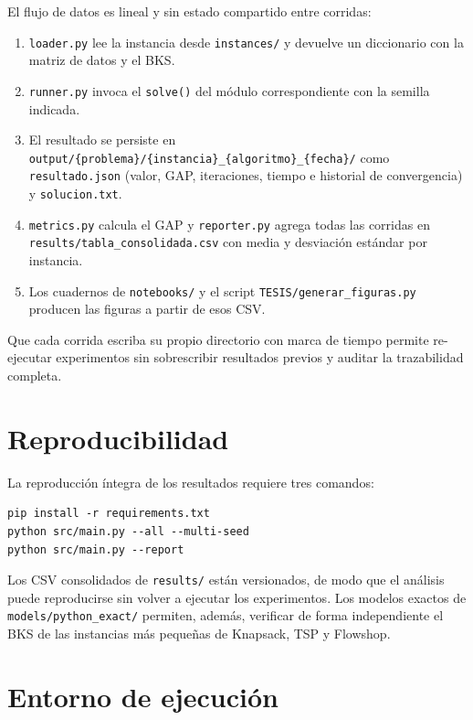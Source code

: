 El flujo de datos es lineal y sin estado compartido entre corridas:

\begin{enumerate}
  \item \texttt{loader.py} lee la instancia desde \texttt{instances/} y
    devuelve un diccionario con la matriz de datos y el BKS.
  \item \texttt{runner.py} invoca el \texttt{solve()} del módulo
    correspondiente con la semilla indicada.
  \item El resultado se persiste en
    \texttt{output/\{problema\}/\{instancia\}\_\{algoritmo\}\_\{fecha\}/}
    como \texttt{resultado.json} (valor, GAP, iteraciones, tiempo e historial
    de convergencia) y \texttt{solucion.txt}.
  \item \texttt{metrics.py} calcula el GAP y \texttt{reporter.py} agrega
    todas las corridas en \texttt{results/tabla\_consolidada.csv} con media y
    desviación estándar por instancia.
  \item Los cuadernos de \texttt{notebooks/} y el script
    \texttt{TESIS/generar\_figuras.py} producen las figuras a partir de esos
    CSV.
\end{enumerate}

Que cada corrida escriba su propio directorio con marca de tiempo permite
re-ejecutar experimentos sin sobrescribir resultados previos y auditar la
trazabilidad completa.

\section{Reproducibilidad}

La reproducción íntegra de los resultados requiere tres comandos:

\begin{verbatim}
pip install -r requirements.txt
python src/main.py --all --multi-seed
python src/main.py --report
\end{verbatim}

Los CSV consolidados de \texttt{results/} están versionados, de modo que el
análisis puede reproducirse sin volver a ejecutar los experimentos.
Los modelos exactos de \texttt{models/python\_exact/} permiten, además,
verificar de forma independiente el BKS de las instancias más pequeñas de
Knapsack, TSP y Flowshop.

\section{Entorno de ejecución}
\label{sec:entorno}

